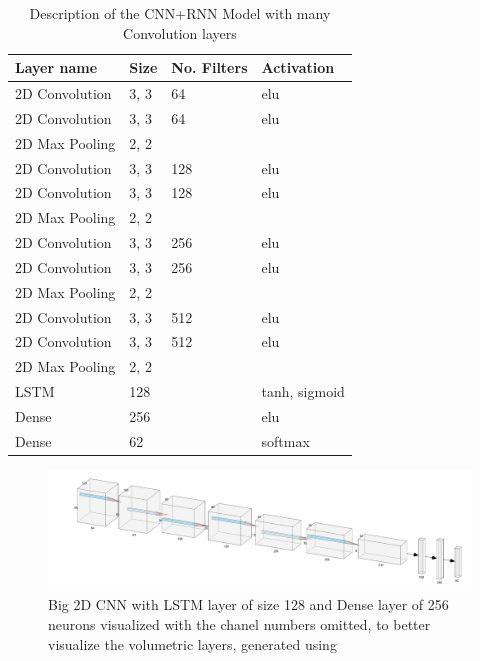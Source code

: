 \documentclass[12pt]{article}
\theoremstyle{definition}
\begin{document}
	\begin{table}[h]
		\centering
		\renewcommand{\arraystretch}{1.5}

		\caption{Description of the CNN+RNN Model with many Convolution layers}
		\label{table:big-CNN-LSTM}

		\begin{tabularx}{\textwidth}{XXXX}
			\textbf{Layer name} & \textbf{Size} & \textbf{No. Filters} & \textbf{Activation} \\ \hline
			2D Convolution & 3, 3 & 64                   & elu                  \\ \hline
			2D Convolution & 3, 3 & 64                   & elu                  \\ \hline
			2D Max Pooling & 2, 2 & \textbf{\textendash} & \textbf{\textendash} \\ \hline
			2D Convolution & 3, 3 & 128                  & elu                  \\ \hline
			2D Convolution & 3, 3 & 128                  & elu                  \\ \hline
			2D Max Pooling & 2, 2 & \textbf{\textendash} & \textbf{\textendash} \\ \hline
			2D Convolution & 3, 3 & 256                  & elu                  \\ \hline
			2D Convolution & 3, 3 & 256                  & elu                  \\ \hline
			2D Max Pooling & 2, 2 & \textbf{\textendash} & \textbf{\textendash} \\ \hline
			2D Convolution & 3, 3 & 512                  & elu                  \\ \hline
			2D Convolution & 3, 3 & 512                  & elu                  \\ \hline
			2D Max Pooling & 2, 2 & \textbf{\textendash} & \textbf{\textendash} \\ \hline
			LSTM           & 128  & \textbf{\textendash} & tanh, sigmoid        \\ \hline
			Dense          & 256  & \textbf{\textendash} & elu                  \\ \hline
			Dense          & 62   & \textbf{\textendash} & softmax              \\
		\end{tabularx}
	\end{table}

	\begin{figure}
		\includegraphics[width=\textwidth]{networks/big-2D-CNN-LSTM-Dense.png}
		\caption{Big 2D CNN with LSTM layer of size 128 and Dense layer of 256 neurons visualized with the chanel numbers omitted, to better visualize the volumetric layers, generated using \cite{nn-svg}}
		\label{figure:big-2D-CNN-LSTM-Dense}
	\end{figure}
\end{document}
